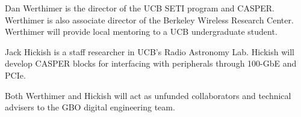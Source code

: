 \documentclass[10pt]{NSF}
\begin{document}
Dan Werthimer is the director of the UCB SETI program and
CASPER. Werthimer is also associate director of the Berkeley Wireless
Research Center. Werthimer will provide local mentoring to a UCB
undergraduate student.

Jack Hickish is a staff researcher in UCB's Radio Astronomy
Lab. Hickish will develop CASPER blocks for interfacing with
peripherals through 100-GbE and PCIe.

Both Werthimer and Hickish will act as unfunded collaborators and
technical advisers to the GBO digital engineering team.
\end{document}
